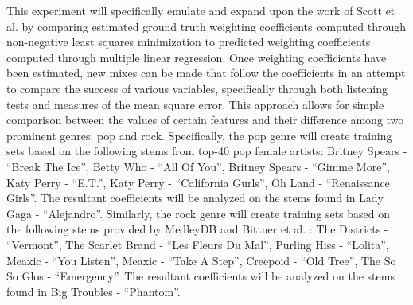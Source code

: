 \documentclass{article}
\begin{document}
This experiment will specifically emulate and expand upon the work of Scott et al. \cite{scott2011automatic} by comparing estimated ground truth weighting coefficients computed through non-negative least squares minimization to predicted weighting coefficients computed through multiple linear regression.  Once weighting coefficients have been estimated, new mixes can be made that follow the coefficients in an attempt to compare the success of various variables, specifically through both listening tests and measures of the mean square error.  This approach allows for simple comparison between the values of certain features and their difference among two prominent genres: pop and rock.  Specifically, the pop genre will create training sets based on the following stems from top-40 pop female artists: Britney Spears - “Break The Ice”, Betty Who - “All Of You”, Britney Spears - “Gimme More”, Katy Perry - “E.T.”, Katy Perry - “California Gurls”, Oh Land - “Renaissance Girls”.  The resultant coefficients will be analyzed on the stems found in Lady Gaga - “Alejandro”.  Similarly, the rock genre will create training sets based on the following stems provided by MedleyDB and Bittner et al. \cite{bittner2014medleydb}: The Districts - “Vermont”, The Scarlet Brand - “Les Fleurs Du Mal”, Purling Hiss - “Lolita”, Meaxic - “You Listen”, Meaxic - “Take A Step”, Creepoid - “Old Tree”, The So So Glos - “Emergency”.  The resultant coefficients will be analyzed on the stems found in Big Troubles - “Phantom”. 
	

\end{document}
